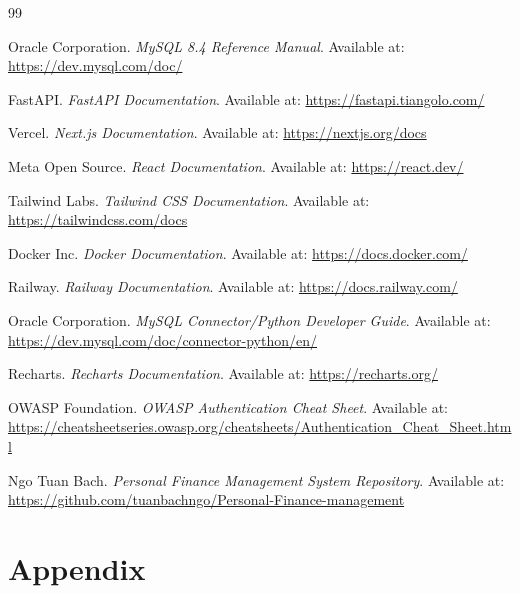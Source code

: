 ﻿\documentclass{article}
\newcommand{\repoURL}{https://github.com/tuanbachngo/Personal-Finance-management}
\begin{document}
\begin{thebibliography}{99}

Oracle Corporation.
\newblock \textit{MySQL 8.4 Reference Manual}.
\newblock Available at: \url{https://dev.mysql.com/doc/}

FastAPI.
\newblock \textit{FastAPI Documentation}.
\newblock Available at: \url{https://fastapi.tiangolo.com/}

Vercel.
\newblock \textit{Next.js Documentation}.
\newblock Available at: \url{https://nextjs.org/docs}

Meta Open Source.
\newblock \textit{React Documentation}.
\newblock Available at: \url{https://react.dev/}

Tailwind Labs.
\newblock \textit{Tailwind CSS Documentation}.
\newblock Available at: \url{https://tailwindcss.com/docs}

Docker Inc.
\newblock \textit{Docker Documentation}.
\newblock Available at: \url{https://docs.docker.com/}

Railway.
\newblock \textit{Railway Documentation}.
\newblock Available at: \url{https://docs.railway.com/}

Oracle Corporation.
\newblock \textit{MySQL Connector/Python Developer Guide}.
\newblock Available at: \url{https://dev.mysql.com/doc/connector-python/en/}

Recharts.
\newblock \textit{Recharts Documentation}.
\newblock Available at: \url{https://recharts.org/}

OWASP Foundation.
\newblock \textit{OWASP Authentication Cheat Sheet}.
\newblock Available at: \url{https://cheatsheetseries.owasp.org/cheatsheets/Authentication_Cheat_Sheet.html}

Ngo Tuan Bach.
\newblock \textit{Personal Finance Management System Repository}.
\newblock Available at: \url{\repoURL}

\end{thebibliography}
\newpage
\clearpage
\appendix

\section*{Appendix}
\end{document}
